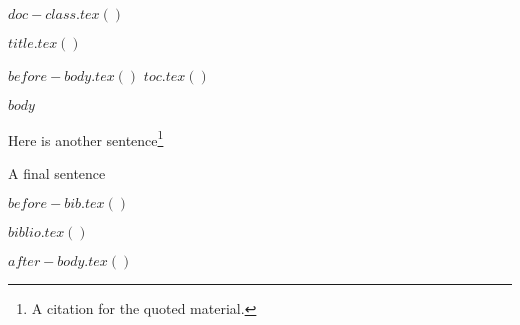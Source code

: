 $doc-class.tex()$

\usepackage[utf8]{inputenc}
\usepackage{csquotes, ellipsis}

\usepackage[pass, letterpaper]{geometry}

\usepackage{biblatex-chicago}



$title.tex()$



$before-body.tex()$
$toc.tex()$

$body$

Here is another sentence\footnote{A citation for the quoted material.}

A final sentence \autocite[34]{CameronTrivedi2013}

$before-bib.tex()$

$biblio.tex()$

$after-body.tex()$



